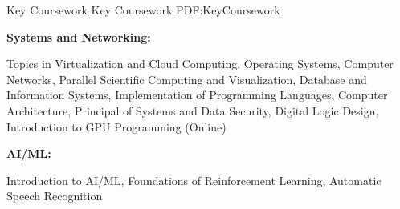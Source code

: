 \Section
{Key Coursework}
{Key Coursework}
{PDF:KeyCoursework}

\textbf{Systems and Networking:}
\begin{Detail}
\Item
Topics in Virtualization and Cloud Computing, Operating Systems, Computer Networks, Parallel Scientific Computing and Visualization, Database and Information Systems, Implementation of Programming Languages, Computer Architecture, Principal of Systems and Data Security, Digital Logic Design, Introduction to GPU Programming (Online)
\end{Detail}

\Gap
\textbf{AI/ML:}
\begin{Detail}
\Item
Introduction to AI/ML, Foundations of Reinforcement Learning, Automatic Speech Recognition
\end{Detail}